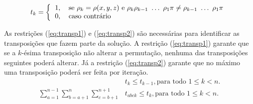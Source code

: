 \[ 
  t_{k} = \left \{ 
  \begin{tabular}{ll} 
  1, & se $\rho_{k} = \rho(x,y,z)$ e
  $\rho_{k} \rho_{k-1}~\ldots~\rho_{1} \pi \neq \rho_{k-1}~\ldots~\rho_{1} \pi$\\
  0, & caso contrário 
  \end{tabular} \right .
\]

As restrições (\ref{eq:transp1}) e (\ref{eq:transp2}) são necessárias
para identificar as transposições que fazem parte da solução. A
restrição (\ref{eq:transp1}) garante que se a $k$-ésima transposição
não alterar a permutação, nenhuma das transposições seguintes poderá
alterar. Já a restrição (\ref{eq:transp2}) garante que no máximo uma
transposição poderá ser feita por iteração.
\begin{align}
  &t_{k} \le t_{k-1}, \text{para todo $1 \le k <
  n$}. \label{eq:transp1} \\
  \sum_{a=1}^{n-1}\sum_{b=a+1}^{n}\sum_{c=b+1}^{n+1} &t_{abck} \le
  t_{k} , \text{para todo $1 \le k <
  n$}. \label{eq:transp2} 
\end{align}

